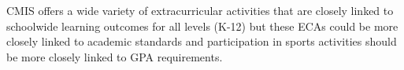 \begin{findings}

CMIS offers a wide variety of extracurricular activities that are closely linked to schoolwide learning outcomes for all levels (K-12) but these ECAs could be more closely linked to academic standards and participation in sports activities should be more closely linked to GPA requirements.
\end{findings}
